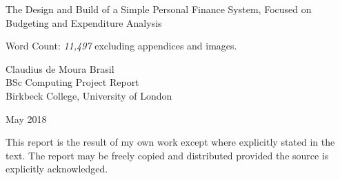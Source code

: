 \begin{titlepage}
  \center
  
  \vspace*{3cm}

  {
    \begin{spacing}{1.2}
      \LARGE The Design and Build of a Simple Personal Finance System, Focused
      on Budgeting and Expenditure Analysis
    \end{spacing}
  }

  \vfill
  
  Word Count: \emph{11,497} excluding appendices and images.
  
  \vfill

  Claudius de Moura Brasil\\
  BSc Computing Project Report\\
  Birkbeck College, University of London

  May 2018

  This report is the result of my own work except where explicitly stated in
  the text. The report may be freely copied and distributed provided the source
  is explicitly acknowledged.
  
  \vfill

\end{titlepage}
